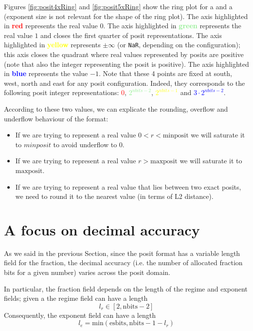 Figures \ref{fig:posit4xRing} and \ref{fig:posit5xRing} show the ring plot for a  and a  (exponent size is not relevant for the shape of the ring plot). The axis highlighted in \textbf{\textcolor{red}{red}} represents the real value $0$. The axis highlighted in \textbf{\textcolor{lightgreen}{green}} represents the real value $1$ and closes the first quarter of posit representations. The axis highlighted in \textbf{\textcolor{yellow}{yellow}} represents $\pm \infty$ (or \texttt{NaR}, depending on the configuration); this axis closes the quadrant where real values represented by posits are positive (note that also the integer representing the posit is positive). The axis highlighted in \textbf{\textcolor{blue}{blue}} represents the value $-1$. Note that these 4 points are fixed at south, west, north and east for any posit configuration. Indeed, they corresponds to the following posit integer representations: \textcolor{red}{0}, \textcolor{lightgreen}{$2^{nbits-2}$}, \textcolor{yellow}{$2^{nbits - 1}$} and \textcolor{blue}{$3 \cdot 2^{nbits-2}$}.

According to these two values, we can explicate the rounding, overflow and underflow behaviour of the format:
\begin{itemize}
    \item If we are trying to represent a real value $0 < r < \text{minposit}$ we will saturate it to $minposit$ to avoid underflow to $0$.
    \item If we are trying to represent a real value $r > \text{maxposit} $ we will saturate it to $\text{maxposit}$.
    \item If we are trying to represent a real value that lies between two exact posits, we need to round it to the nearest value (in terms of L2 distance).
\end{itemize}




\section{A focus on decimal accuracy}

As we said in the previous Section, since the posit format has a variable length field for the fraction, the decimal accuracy (i.e. the number of allocated fraction bits for a given number) varies across the posit domain.

In particular, the fraction field depends on the length of the regime and exponent fields; given a  the regime field can have a length 
\[
l_r \in [2,\text{nbits}-2]
\]
Consequently, the exponent field can have a length 
\[
l_e = \text{min}(\text{esbits},\text{nbits}-1-l_r)
\]

